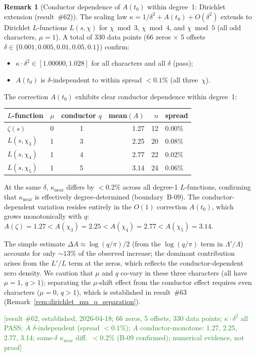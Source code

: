 \documentclass[11pt, a4paper]{article}
\theoremstyle{definition}
\newtheorem{remark}{Remark}[section]
\theoremstyle{plain}
\begin{document}
\begin{remark}[Conductor dependence of $A(t_0)$ within degree~1: Dirichlet extension (result~\#62)]
\label{rem:dirichlet_conductor_A}
The scaling law $\kappa = 1/\delta^2 + A(t_0) + O(\delta^2)$ extends to
Dirichlet $L$-functions $L(s,\chi)$ for $\chi\bmod 3$, $\chi\bmod 4$, and
$\chi\bmod 5$ (all odd characters, $\mu = 1$).
A total of 330 data points (66 zeros $\times$ 5 offsets
$\delta \in \{0.001, 0.005, 0.01, 0.05, 0.1\}$) confirm:
\begin{itemize}
  \item $\kappa\cdot\delta^2 \in [1.00000, 1.028]$ for all characters and all $\delta$ (pass);
  \item $A(t_0)$ is $\delta$-independent to within spread $< 0.1\%$ (all three~$\chi$).
\end{itemize}
The correction $A(t_0)$ exhibits clear conductor dependence within degree~1:
\smallskip
\begin{center}
\small
\begin{tabular}{@{}llcrrl@{}}
\toprule
$L$-function & $\mu$ & conductor $q$ & mean$(A)$ & $n$ & spread \\
\midrule
$\zeta(s)$ & 0 & 1 & 1.27 & 12 & 0.00\% \\
$L(s,\chi_3)$ & 1 & 3 & 2.25 & 20 & 0.08\% \\
$L(s,\chi_4)$ & 1 & 4 & 2.77 & 22 & 0.02\% \\
$L(s,\chi_5)$ & 1 & 5 & 3.14 & 24 & 0.06\% \\
\bottomrule
\end{tabular}
\end{center}
\smallskip\noindent
At the same $\delta$, $\kappa_{\mathrm{near}}$ differs by $< 0.2\%$ across all
degree-1 $L$-functions, confirming that $\kappa_{\mathrm{near}}$ is
effectively degree-determined (boundary~B-09).
The conductor-dependent variation resides entirely in the $O(1)$ correction $A(t_0)$,
which grows monotonically with $q$:
$A(\zeta) = 1.27 < A(\chi_3) = 2.25 < A(\chi_4) = 2.77 < A(\chi_5) = 3.14$.

The simple estimate $\Delta A \approx \log(q/\pi)/2$ (from the $\log(q/\pi)$ term
in $\Lambda'/\Lambda$) accounts for only $\sim\!13\%$ of the observed increase;
the dominant contribution arises from the $L'/L$ term at the zeros,
which reflects the conductor-dependent zero density.
We caution that $\mu$ and $q$ co-vary in these three characters
(all have $\mu = 1$, $q > 1$); separating the $\mu$-shift effect from the
conductor effect requires even characters ($\mu = 0$, $q > 1$),
which is established in result~\#63 (Remark~\ref{rem:dirichlet_mu_q_separation}).

\textcolor{ForestGreen}{[result \#62, established, 2026-04-18;
66 zeros, 5 offsets, 330 data points;
$\kappa{\cdot}\delta^2$ all PASS; $A$ $\delta$-independent (spread ${<}0.1\%$);
$A$ conductor-monotone: 1.27, 2.25, 2.77, 3.14;
same-$\delta$ $\kappa_{\mathrm{near}}$ diff.\ ${<}0.2\%$ (B-09 confirmed);
numerical evidence, not proof]}
\end{remark}
\end{document}
